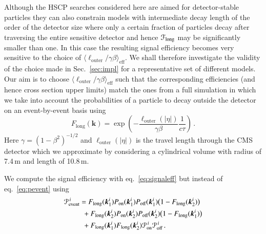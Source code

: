 \documentclass[preprint,number,sort&compress,twocolumn,3p]{elsstyarticle}
\renewcommand{\vec}[1]{\boldsymbol{#1}}
\begin{document}
\begin{appendix}
Although the HSCP searches considered here are aimed for detector-stable particles
they can also constrain models with intermediate decay length of the order of the detector size
where only a certain fraction of particles decay after traversing the entire sensitive detector and hence
${\cal F}_\mathrm{long}$ may be significantly smaller than one. In this case 
the resulting signal efficiency becomes very sensitive to the choice of $\langle\ell_\text{outer}/\gamma\beta\rangle_\text{eff}$.
We shall therefore investigate the validity of the choice made in Sec.~\ref{sec:impl}
for a representative set of different models. Our aim is to choose
$\langle\ell_\text{outer}/\gamma\beta\rangle_\text{eff}$ such that the corresponding
efficiencies (and hence cross section upper limits) match the ones from a full simulation 
in which we take into account the probabilities of a particle to decay outside the detector on an
event-by-event basis using
\begin{equation}
F_\text{long}(\vec{k}) = \exp\left(-\frac{\ell_\text{outer}(|\eta|)}{\gamma \beta }\frac{1}{c\tau}\right)\,.
\end{equation}
Here $\gamma = (1-\beta^2)^{-1/2}$ and $\ell_\text{outer}(|\eta|)$ is the travel length
through the CMS detector which we approximate by considering a cylindrical volume with radius of 7.4\,m and length of 10.8\,m.
  




We compute the signal efficiency with eq.~\eqref{eq:signaleff} but instead of eq.~\eqref{eq:pevent} using 
\begin{equation}
\begin{split}
\label{eq:Pevfull}
{\cal P}^{\,i}_\text{event} = &\;
F_\mathrm{long}(\vec{k}_1^i)  P_{\text{on}}(\vec{k}_1^i) P_{\text{off}}(\vec{k}_1^i) \big(1- F_\mathrm{long}(\vec{k}_2^i)\big)\\
&\!\!\!+F_\mathrm{long}(\vec{k}_2^i)  P_{\text{on}}(\vec{k}_2^i) P_{\text{off}}(\vec{k}_2^i) \big(1- F_\mathrm{long}(\vec{k}_1^i)\big)\\
&\!\!\!+ F_\mathrm{long}(\vec{k}_1^i) F_\mathrm{long}(\vec{k}_2^i) {\cal P}^{\,i}_\text{on} {\cal P}^{\,i}_\text{off}\,.
\end{split}
\end{equation}


\end{appendix}
\end{document}
